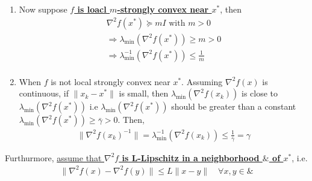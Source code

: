 \documentclass[11pt]{elegantbook}
\begin{document}
\begin{enumerate}[$\bullet$]
    \item Now suppose \textbf{\underline{$f$ is loacl $m$-strongly convex near $x^*$}}, then
    \begin{equation}
        \begin{aligned}
            \nabla^2 f(x^*)\succeq mI\text{ with }m>0\\
            \Rightarrow	\lambda_{\min}( \nabla^2 f(x^*))\geq m>0\\
            \Rightarrow	\lambda^{-1}_{\min}( \nabla^2 f(x^*))\leq \frac{1}{m}\\
        \end{aligned}
        \nonumber
    \end{equation}
    \item When $f$ is not local strongly convex near $x^*$. Assuming $\nabla^2 f(x)$ is continuous, if $\|x_k-x^*\|$ is small, then $\lambda_{\min}(\nabla^2 f(x_k))$ is close to $\lambda_{\min}(\nabla^2 f(x^*))$ i.e $\lambda_{\min}(\nabla^2 f(x^*))$ should be greater than a constant $\lambda_{\min}(\nabla^2 f(x^*))\geq \bar{\gamma}>0$. Then,
    \begin{equation}
        \begin{aligned}
            \|\nabla^2 f(x_k)^{-1}\|=\lambda^{-1}_{\min}(\nabla^2 f(x_k))\leq \frac{1}{\bar{\gamma}}=\gamma
        \end{aligned}
        \nonumber
    \end{equation}
\end{enumerate}

Furthurmore, \underline{assume that \textbf{$\nabla^2 f$ is L-Lipschitz in a neighborhood $\&$ of $x^*$}}, i.e.
\begin{equation}
    \begin{aligned}
        \|\nabla^2 f(x)-\nabla^2 f(y)\|\leq L\|x-y\|\quad \forall x,y\in \&
    \end{aligned}
    \nonumber
\end{equation}
\end{document}
